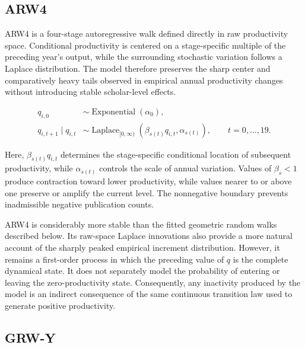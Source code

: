 \documentclass[twocolumn, letterpaper]{article}
\begin{document}
\subsection{ARW4}
\label{supp:arw4}

ARW4 is a four-stage autoregressive walk defined directly in raw productivity space. Conditional productivity is centered on a stage-specific multiple of the preceding year's output, while the surrounding stochastic variation follows a Laplace distribution. The model therefore preserves the sharp center and comparatively heavy tails observed in empirical annual productivity changes without introducing stable scholar-level effects.

\begin{equation}
    \begin{aligned}
    q_{i,0}
        &\sim \operatorname{Exponential}(\alpha_0), \\[4pt]
    q_{i,t+1}\mid q_{i,t}
        &\sim \operatorname{Laplace}_{[0,\infty)}
        \left(
            \beta_{s(t)}q_{i,t},
            \alpha_{s(t)}
        \right),
        \qquad t=0,\ldots,19.
    \end{aligned}
\label{eq:arw4}
\end{equation}

Here, \(\beta_{s(t)}q_{i,t}\) determines the stage-specific conditional location of subsequent productivity, while \(\alpha_{s(t)}\) controls the scale of annual variation. Values of \(\beta_s<1\) produce contraction toward lower productivity, while values nearer to or above one preserve or amplify the current level. The nonnegative boundary prevents inadmissible negative publication counts.

ARW4 is considerably more stable than the fitted geometric random walks described below. Its raw-space Laplace innovations also provide a more natural account of the sharply peaked empirical increment distribution. However, it remains a first-order process in which the preceding value of \(q\) is the complete dynamical state. It does not separately model the probability of entering or leaving the zero-productivity state. Consequently, any inactivity produced by the model is an indirect consequence of the same continuous transition law used to generate positive productivity.

\subsection{GRW-Y}
\label{supp:grw_y}
\end{document}

